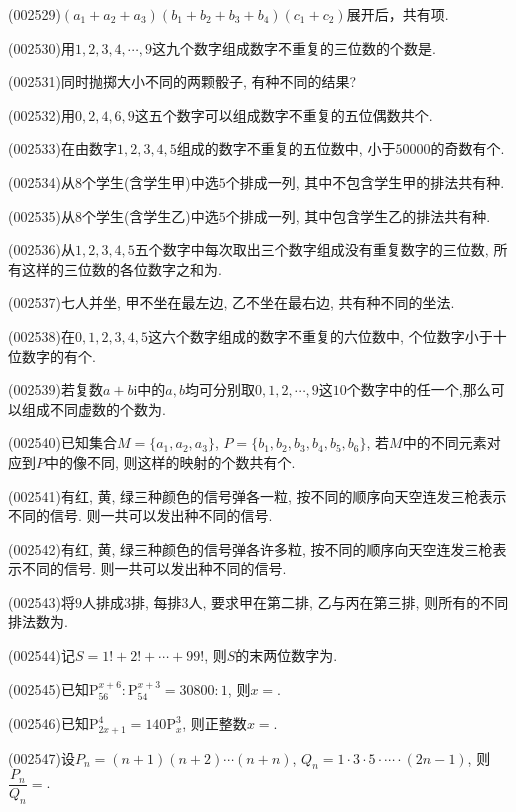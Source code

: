 \item (002529)$(a_1+a_2+a_3)(b_1+b_2+b_3+b_4)(c_1+c_2)$展开后，共有项.
\item (002530)用$1,2,3,4,\cdots,9$这九个数字组成数字不重复的三位数的个数是.
\item (002531)同时抛掷大小不同的两颗骰子, 有种不同的结果?
\item (002532)用$0,2,4,6,9$这五个数字可以组成数字不重复的五位偶数共个.
\item (002533)在由数字$1,2,3,4,5$组成的数字不重复的五位数中, 小于$50000$的奇数有个.
\item (002534)从$8$个学生(含学生甲)中选$5$个排成一列, 其中不包含学生甲的排法共有种.
\item (002535)从$8$个学生(含学生乙)中选$5$个排成一列, 其中包含学生乙的排法共有种.
\item (002536)从$1,2,3,4,5$五个数字中每次取出三个数字组成没有重复数字的三位数, 所有这样的三位数的各位数字之和为.
\item (002537)七人并坐, 甲不坐在最左边, 乙不坐在最右边, 共有种不同的坐法.
\item (002538)在$0,1,2,3,4,5$这六个数字组成的数字不重复的六位数中, 个位数字小于十位数字的有个.
\item (002539)若复数$a+b\mathrm{i}$中的$a,b$均可分别取$0,1,2,\cdots,9$这$10$个数字中的任一个,那么可以组成不同虚数的个数为.
\item (002540)已知集合$M=\{a_1,a_2,a_3\}$, $P=\{b_1,b_2,b_3,b_4,b_5,b_6\}$, 若$M$中的不同元素对应到$P$中的像不同, 则这样的映射的个数共有个.
\item (002541)有红, 黄, 绿三种颜色的信号弹各一粒, 按不同的顺序向天空连发三枪表示不同的信号. 则一共可以发出种不同的信号.
\item (002542)有红, 黄, 绿三种颜色的信号弹各许多粒, 按不同的顺序向天空连发三枪表示不同的信号. 则一共可以发出种不同的信号.
\item (002543)将$9$人排成$3$排, 每排$3$人, 要求甲在第二排, 乙与丙在第三排, 则所有的不同排法数为.
\item (002544)记$S=1!+2!+\cdots+99!$, 则$S$的末两位数字为.
\item (002545)已知$\mathrm{P}_{56}^{x+6}:\mathrm{P}_{54}^{x+3}=30800:1$, 则$x=$.
\item (002546)已知$\mathrm{P}_{2x+1}^4=140\mathrm{P}_x^3$, 则正整数$x=$.
\item (002547)设$P_n=(n+1)(n+2)\cdots(n+n)$, $Q_n=1\cdot 3\cdot 5\cdot \cdots\cdot(2n-1)$, 则$\dfrac{P_n}{Q_n}=$.
